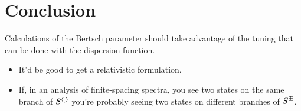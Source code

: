 \section{Conclusion}\label{sec:conclusion}

Calculations of the Bertsch parameter should take advantage of the tuning that can be done with the dispersion function.

\begin{itemize}
    \item It'd be good to get a relativistic formulation.
    \item If, in an analysis of finite-spacing spectra, you see two states on the same branch of $S^\bigcirc$ you're probably seeing two states on different branches of $S^\boxplus$.
\end{itemize}

